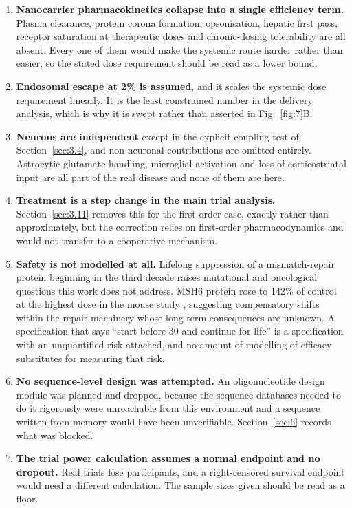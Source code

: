 \documentclass[conference]{IEEEtran}
\begin{document}
\begin{enumerate}
\item \textbf{Nanocarrier pharmacokinetics collapse into a single efficiency term.} Plasma clearance, protein corona formation, opsonisation, hepatic first pass, receptor saturation at therapeutic doses and chronic-dosing tolerability are all absent. Every one of them would make the systemic route harder rather than easier, so the stated dose requirement should be read as a lower bound.
\item \textbf{Endosomal escape at 2\% is assumed}, and it scales the systemic dose requirement linearly. It is the least constrained number in the delivery analysis, which is why it is swept rather than asserted in Fig.~\ref{fig:7}B.
\item \textbf{Neurons are independent} except in the explicit coupling test of Section~\ref{sec:3.4}, and non-neuronal contributions are omitted entirely. Astrocytic glutamate handling, microglial activation and loss of corticostriatal input are all part of the real disease and none of them are here.
\item \textbf{Treatment is a step change in the main trial analysis.} Section~\ref{sec:3.11} removes this for the first-order case, exactly rather than approximately, but the correction relies on first-order pharmacodynamics and would not transfer to a cooperative mechanism.
\item \textbf{Safety is not modelled at all.} Lifelong suppression of a mismatch-repair protein beginning in the third decade raises mutational and oncological questions this work does not address. MSH6 protein rose to 142\% of control at the highest dose in the mouse study \cite{disirna}, suggesting compensatory shifts within the repair machinery whose long-term consequences are unknown. A specification that says ``start before 30 and continue for life'' is a specification with an unquantified risk attached, and no amount of modelling of efficacy substitutes for measuring that risk.
\item \textbf{No sequence-level design was attempted.} An oligonucleotide design module was planned and dropped, because the sequence databases needed to do it rigorously were unreachable from this environment and a sequence written from memory would have been unverifiable. Section~\ref{sec:6} records what was blocked.
\item \textbf{The trial power calculation assumes a normal endpoint and no dropout.} Real trials lose participants, and a right-censored survival endpoint would need a different calculation. The sample sizes given should be read as a floor.

\end{enumerate}
\end{document}

